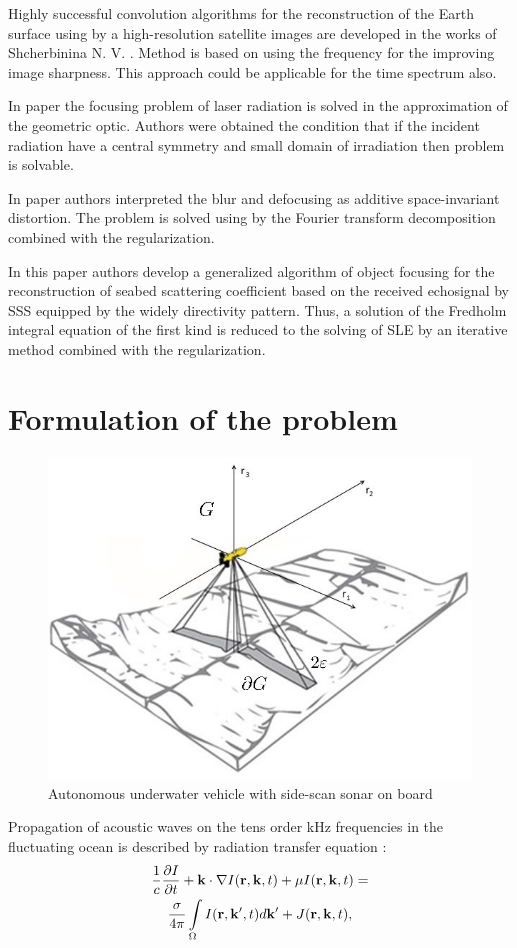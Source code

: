 \documentclass{procDDs}
\begin{document}
Highly successful convolution algorithms for the reconstruction of  the Earth surface  using by a high-resolution satellite images are developed in the works of Shcherbinina N. V. \cite{Shcherbinina}. Method is based on using the frequency for the improving image sharpness. This approach could be applicable for the time spectrum also.

In paper \cite{p2} the focusing problem of laser radiation is solved in the approximation of the geometric optic. Authors were obtained the condition that if the incident radiation have a central symmetry and small domain of irradiation then problem is solvable.

In paper \cite{p3} authors interpreted the blur and defocusing as additive space-invariant distortion. The problem is solved using by the Fourier transform decomposition combined with the regularization.

In this paper authors develop a generalized algorithm of object focusing for the reconstruction of seabed scattering coefficient based on the received echosignal by SSS equipped by the widely directivity pattern. Thus, a solution of the Fredholm integral equation of the first kind is reduced to the solving of SLE by an iterative method combined with the regularization.

\section{Formulation of the problem}
\begin{figure}[h!]\center
	
	\includegraphics[width=1\linewidth]{img/gbo.jpg}
	\caption{Autonomous underwater vehicle with side-scan sonar on board}
	\label{ris:gbo}
\end{figure}
Propagation of acoustic waves on the tens order kHz frequencies in the fluctuating ocean is described by radiation
transfer equation \cite{AF2015, SPIE_KOV,SMJ2015, Prokh_Sush_Kim_2017}:
\begin{multline}
	\label{model}
	\frac{1}{c} \frac{\partial I}{\partial t} + \mathbf{k} \cdot \nabla I(\mathbf{r},\mathbf{k},t) + \mu I(\mathbf{r},\mathbf{k},t) = \\
	\frac{\sigma}{4 \pi} \int\limits_{\Omega} I(\mathbf{r},\mathbf{k}',t) d\mathbf{k}' + J(\mathbf{r},\mathbf{k},t),
\end{multline}
\end{document}
